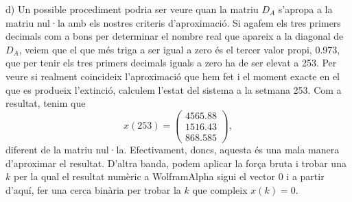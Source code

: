 \documentclass[11pt]{article}
\begin{document}
\begin{legal}
\begin{legal}
	\item[d)] Un possible procediment podria ser veure quan la matriu $D_A$ s'apropa a la matriu nul·la amb els nostres criteris d'aproximació. Si agafem els tres primers decimals com a bons per determinar el nombre real que apareix a la diagonal de $D_A$, veiem que el que més triga a ser igual a zero és el tercer valor propi, 0.973, que per tenir els tres primers decimals iguals a zero ha de ser elevat a 253. Per veure si realment coincideix l'aproximació que hem fet i el moment exacte en el que es produeix l'extinció, calculem l'estat del sistema a la setmana 253. Com a resultat, tenim que
	$$
	x(253)=\begin{pmatrix}
	4565.88\\ 1516.43\\ 868.585
	\end{pmatrix},
	$$
	diferent de la matriu nul·la. Efectivament, doncs, aquesta és una mala manera d'aproximar el resultat. D'altra banda, podem aplicar la força bruta i trobar una $k$ per la qual el resultat numèric a WolframAlpha sigui el vector 0 i a partir d'aquí, fer una cerca binària per trobar la $k$ que compleix $x(k)=0$.
	\end{legal}
\end{legal}
\end{document}
